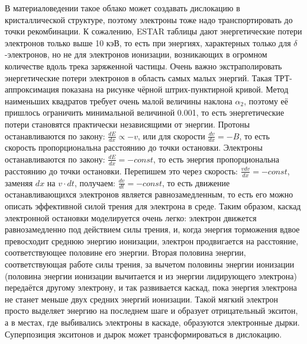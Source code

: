 \documentclass[a4paper,12pt]{article}
\begin{document}
\begin{large}
  В материаловедении такое облако может создавать дислокацию в кристаллической структуре, поэтому электроны тоже надо транспортировать до точки рекомбинации.
  К сожалению, ESTAR таблицы дают энергетические потери электронов только выше 10 кэВ, то есть при энергиях, характерных только для $\delta$-электронов, но не для электронов ионизации, возникающих в огромном количестве вдоль трека заряженной частицы.
  Очень важно экстраполировать энергетические потери электронов в область самых малых энергий.
  Такая ТРТ-аппроксимация показана на рисунке чёрной штрих-пунктирной кривой.
  Метод наименьших квадратов требует очень малой величины наклона $\alpha_2$, поэтому её пришлось ограничить минимальной величиной 0.001, то есть энергетические потери становятся практически независящими от энергии.
  Протоны останавливаются по закону: $\frac{dE}{dx}\propto -v$, или для скорости $\frac{dv}{dx}=-B$, то есть скорость пропорциональна расстоянию до точки остановки.
  Электроны останавливаются по закону: $\frac{dE}{dx}=-const$, то есть энергия пропорциональна расстоянию до точки остановки.
  Перепишем это через скорость: $\frac{vdv}{dx}=-const$, заменяя $dx$ на $v\cdot dt$, получаем: $\frac{dv}{dt}=-const$, то есть движение останавливающихся электронов является равнозамедленным, то есть его можно описать эффективной силой трения для электрона в среде.
  Таким образом, каскад электронной остановки моделируется очень легко: электрон движется равнозамедленно под действием силы трения, и, когда энергия торможения вдвое превосходит среднюю энергию ионизации, электрон продвигается на расстояние, соответствующее половине его энергии.
  Вторая половина энергии, соответствующая работе силы трения, за вычетом половины энергии ионизации (половина энергии ионизации вычитается и из энергии лидирующего электрона) передаётся другому электрону, и так развивается каскад, пока энергия электрона не станет меньше двух средних энергий ионизации.
  Такой мягкий электрон просто выделяет энергию на последнем шаге и образует отрицательный экситон, а в местах, где выбивались электроны в каскаде, образуются электронные дырки.
  Суперпозиция экситонов и дырок может трансформироваться в дислокацию.
   

\end{large}
\end{document}
